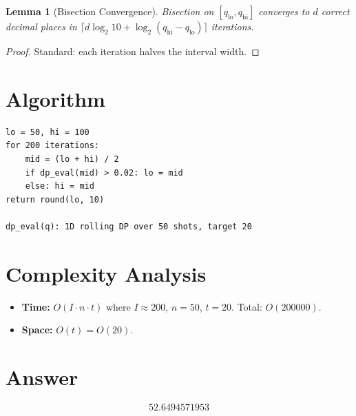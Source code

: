 \documentclass[12pt]{article}
\newtheorem{lemma}[theorem]{Lemma}
\begin{document}
\begin{lemma}[Bisection Convergence]
Bisection on $[q_{\mathrm{lo}}, q_{\mathrm{hi}}]$ converges to $d$ correct decimal places in $\lceil d \log_2 10 + \log_2(q_{\mathrm{hi}} - q_{\mathrm{lo}}) \rceil$ iterations.
\end{lemma}

\begin{proof}
Standard: each iteration halves the interval width.
\end{proof}

\section{Algorithm}

\begin{verbatim}
lo = 50, hi = 100
for 200 iterations:
    mid = (lo + hi) / 2
    if dp_eval(mid) > 0.02: lo = mid
    else: hi = mid
return round(lo, 10)

dp_eval(q): 1D rolling DP over 50 shots, target 20
\end{verbatim}

\section{Complexity Analysis}

\begin{itemize}
\item \textbf{Time:} $O(I \cdot n \cdot t)$ where $I \approx 200$, $n = 50$, $t = 20$. Total: $O(200000)$.
\item \textbf{Space:} $O(t) = O(20)$.
\end{itemize}

\section{Answer}

\[
\boxed{52.6494571953}
\]
\end{document}
